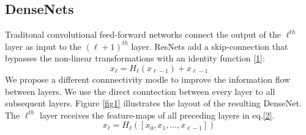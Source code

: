 \documentclass[10pt,letterpaper]{article}
\begin{document}
\begin{multicols}{2}
\section{DenseNets}
Traditonal convolutional feed-forward networks connect the output of the $\ell^{th}$ layer as input to the $(\ell + 1)^{th}$ layer. ResNets \cite{Deep} add a skip-connection that bypasses the non-linear transformations with an identity function \eqref{1}:
\begin{equation}
x_{\ell} = H_{\ell}(x_{\ell-1}) + x_{\ell-1}
\label{1} 
\end{equation}
We propose a different connnectivity modle to improve the information flow between layers. We use the direct conntection between every layer to all subsequent layers. Figure \ref{fig1} illustrates the layout of the resulting DenseNet. The $\ell^{th}$ layer receives the feature-maps of all preceding layers in eq.\eqref{2}.
\begin{equation}
x_{\ell} = H_{\ell}([x_0,x_1,\dots,x_{\ell-1}])
\label{2}
\end{equation} 

\end{multicols}
\end{document}

